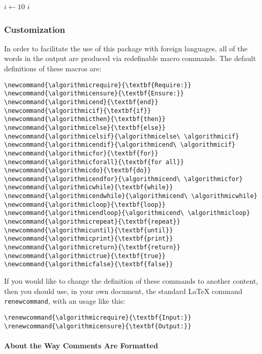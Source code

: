 \documentclass[letterpaper]{article}
\newcommand{\keyword}[1]{\texttt{#1}}
\begin{document}
\begin{algorithmic}[1]
   \STATE $i \leftarrow 10$
   \RETURN $i$
\end{algorithmic}

\subsubsection{Customization}

In order to facilitate the use of this package with foreign languages,
all of the words in the output are produced via redefinable macro
commands.  The default definitions of these macros are:
\begin{verbatim}
\newcommand{\algorithmicrequire}{\textbf{Require:}}
\newcommand{\algorithmicensure}{\textbf{Ensure:}}
\newcommand{\algorithmicend}{\textbf{end}}
\newcommand{\algorithmicif}{\textbf{if}}
\newcommand{\algorithmicthen}{\textbf{then}}
\newcommand{\algorithmicelse}{\textbf{else}}
\newcommand{\algorithmicelsif}{\algorithmicelse\ \algorithmicif}
\newcommand{\algorithmicendif}{\algorithmicend\ \algorithmicif}
\newcommand{\algorithmicfor}{\textbf{for}}
\newcommand{\algorithmicforall}{\textbf{for all}}
\newcommand{\algorithmicdo}{\textbf{do}}
\newcommand{\algorithmicendfor}{\algorithmicend\ \algorithmicfor}
\newcommand{\algorithmicwhile}{\textbf{while}}
\newcommand{\algorithmicendwhile}{\algorithmicend\ \algorithmicwhile}
\newcommand{\algorithmicloop}{\textbf{loop}}
\newcommand{\algorithmicendloop}{\algorithmicend\ \algorithmicloop}
\newcommand{\algorithmicrepeat}{\textbf{repeat}}
\newcommand{\algorithmicuntil}{\textbf{until}}
\newcommand{\algorithmicprint}{\textbf{print}}
\newcommand{\algorithmicreturn}{\textbf{return}}
\newcommand{\algorithmictrue}{\textbf{true}}
\newcommand{\algorithmicfalse}{\textbf{false}}
\end{verbatim}

If you would like to change the definition of these commands to another
content, then you should use, in your own document, the standard
\LaTeX{} command \keyword{renewcommand}, with an usage like this:
\begin{verbatim}
\renewcommand{\algorithmicrequire}{\textbf{Input:}}
\renewcommand{\algorithmicensure}{\textbf{Output:}}
\end{verbatim}

\paragraph{About the Way Comments Are Formatted}
\end{document}
